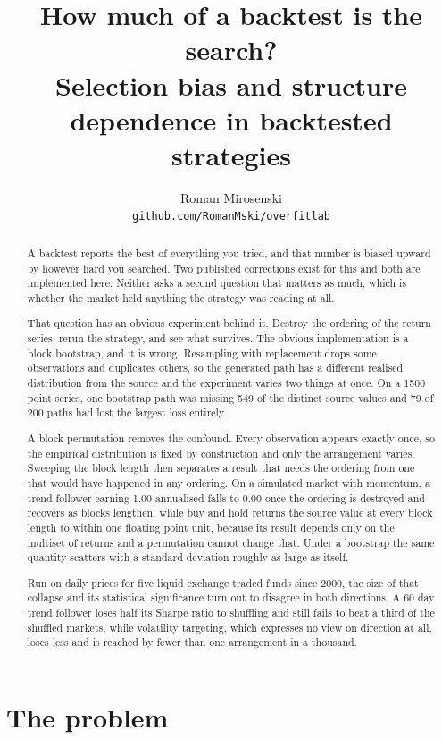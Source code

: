 \documentclass[11pt]{article}
\title{\textbf{How much of a backtest is the search?}\\[4pt]
\large Selection bias and structure dependence in backtested strategies}
\author{Roman Mirosenski\\[2pt]\small\texttt{github.com/RomanMski/overfitlab}}
\date{}
\begin{document}
\maketitle

\begin{abstract}
A backtest reports the best of everything you tried, and that number is biased upward by however hard you searched. Two published corrections exist for this and both are implemented here. Neither asks a second question that matters as much, which is whether the market held anything the strategy was reading at all.

That question has an obvious experiment behind it. Destroy the ordering of the return series, rerun the strategy, and see what survives. The obvious implementation is a block bootstrap, and it is wrong. Resampling with replacement drops some observations and duplicates others, so the generated path has a different realised distribution from the source and the experiment varies two things at once. On a 1500 point series, one bootstrap path was missing 549 of the distinct source values and 79 of 200 paths had lost the largest loss entirely.

A block permutation removes the confound. Every observation appears exactly once, so the empirical distribution is fixed by construction and only the arrangement varies. Sweeping the block length then separates a result that needs the ordering from one that would have happened in any ordering. On a simulated market with momentum, a trend follower earning 1.00 annualised falls to 0.00 once the ordering is destroyed and recovers as blocks lengthen, while buy and hold returns the source value at every block length to within one floating point unit, because its result depends only on the multiset of returns and a permutation cannot change that. Under a bootstrap the same quantity scatters with a standard deviation roughly as large as itself.

Run on daily prices for five liquid exchange traded funds since 2000, the size of that collapse and its statistical significance turn out to disagree in both directions. A 60 day trend follower loses half its Sharpe ratio to shuffling and still fails to beat a third of the shuffled markets, while volatility targeting, which expresses no view on direction at all, loses less and is reached by fewer than one arrangement in a thousand.
\end{abstract}

\section{The problem}\label{sec:problem}
\end{document}

